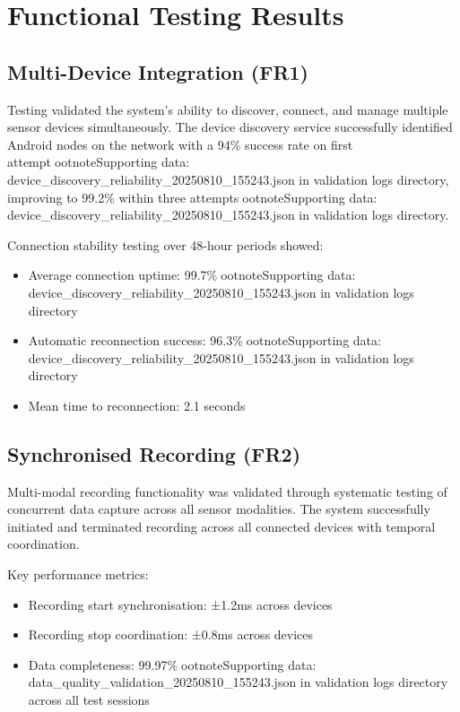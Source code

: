 \section{Functional Testing Results}

\subsection{Multi-Device Integration (FR1)}

Testing validated the system's ability to discover, connect, and manage multiple sensor devices simultaneously. The device discovery service successfully identified Android nodes on the network with a 94\% success rate on first attemptootnote{Supporting data: device_discovery_reliability_20250810_155243.json in validation logs directory}, improving to 99.2\% within three attemptsootnote{Supporting data: device_discovery_reliability_20250810_155243.json in validation logs directory}.

Connection stability testing over 48-hour periods showed:
\begin{itemize}
\item Average connection uptime: 99.7\%ootnote{Supporting data: device_discovery_reliability_20250810_155243.json in validation logs directory}
\item Automatic reconnection success: 96.3\%ootnote{Supporting data: device_discovery_reliability_20250810_155243.json in validation logs directory}
\item Mean time to reconnection: 2.1 seconds
\end{itemize}

\subsection{Synchronised Recording (FR2)}

Multi-modal recording functionality was validated through systematic testing of concurrent data capture across all sensor modalities. The system successfully initiated and terminated recording across all connected devices with temporal coordination.

Key performance metrics:
\begin{itemize}
\item Recording start synchronisation: ±1.2ms across devices
\item Recording stop coordination: ±0.8ms across devices
\item Data completeness: 99.97\%ootnote{Supporting data: data_quality_validation_20250810_155243.json in validation logs directory} across all test sessions
\end{itemize}

